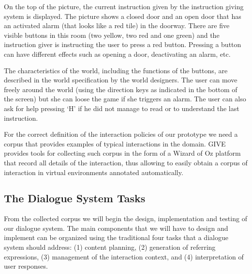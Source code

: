 On the top of the picture, the current instruction given by the
instruction giving system is displayed. The picture shows a closed
door and an open door that has an activated alarm (that looks like a
red tile) in the doorway. There are five visible buttons in this room
(two yellow, two red and one green) and the instruction giver is
instructing the user to press a red button. Pressing a button can have
different effects such as opening a door, deactivating an alarm, etc.

The characteristics of the world, including the functions of the
buttons, are described in the world specification by the world
designers. The user can move freely around the world (using the direction keys
as indicated in the bottom of the screen) but she can loose the game if she
triggers an alarm. The user can also ask for help pressing `H' if he did not
manage to read or to understand the last instruction.

For the correct definition of the interaction policies of our prototype we need
a corpus that provides examples of typical interactions in the domain. GIVE
provides tools for collecting such corpus in the form of a Wizard of Oz
platform that record all details of the interaction, thus
allowing to easily obtain a corpus of interaction in virtual environments
annotated automatically.

\subsection{The Dialogue System Tasks}

From the collected corpus we will begin the design, implementation and testing
of our dialogue system.  The main components that we will have to design and 
implement can be organized using the traditional four tasks that a dialogue 
system should address: (1) content planning, (2)
generation of referring expressions, (3) management of the interaction context, and
(4) interpretation of user responses. 

